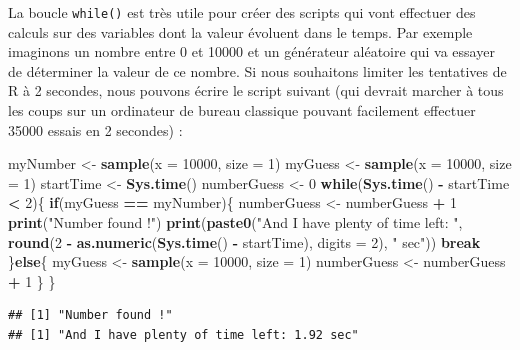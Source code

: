 \documentclass[]{book}
\newenvironment{Shaded}{\begin{snugshade}}{\end{snugshade}}
\newcommand{\ControlFlowTok}[1]{\textcolor[rgb]{0.13,0.29,0.53}{\textbf{#1}}}
\newcommand{\DataTypeTok}[1]{\textcolor[rgb]{0.13,0.29,0.53}{#1}}
\newcommand{\DecValTok}[1]{\textcolor[rgb]{0.00,0.00,0.81}{#1}}
\newcommand{\KeywordTok}[1]{\textcolor[rgb]{0.13,0.29,0.53}{\textbf{#1}}}
\newcommand{\NormalTok}[1]{#1}
\newcommand{\OperatorTok}[1]{\textcolor[rgb]{0.81,0.36,0.00}{\textbf{#1}}}
\newcommand{\StringTok}[1]{\textcolor[rgb]{0.31,0.60,0.02}{#1}}
\begin{document}
La boucle \texttt{while()} est très utile pour créer des scripts qui vont effectuer des calculs sur des variables dont la valeur évoluent dans le temps. Par exemple imaginons un nombre entre 0 et 10000 et un générateur aléatoire qui va essayer de déterminer la valeur de ce nombre. Si nous souhaitons limiter les tentatives de R à 2 secondes, nous pouvons écrire le script suivant (qui devrait marcher à tous les coups sur un ordinateur de bureau classique pouvant facilement effectuer 35000 essais en 2 secondes) :

\begin{Shaded}
\begin{Highlighting}[]
\NormalTok{myNumber <-}\StringTok{ }\KeywordTok{sample}\NormalTok{(}\DataTypeTok{x =} \DecValTok{10000}\NormalTok{, }\DataTypeTok{size =} \DecValTok{1}\NormalTok{)}
\NormalTok{myGuess <-}\StringTok{ }\KeywordTok{sample}\NormalTok{(}\DataTypeTok{x =} \DecValTok{10000}\NormalTok{, }\DataTypeTok{size =} \DecValTok{1}\NormalTok{)}
\NormalTok{startTime <-}\StringTok{ }\KeywordTok{Sys.time}\NormalTok{()}
\NormalTok{numberGuess <-}\StringTok{ }\DecValTok{0}
\ControlFlowTok{while}\NormalTok{(}\KeywordTok{Sys.time}\NormalTok{() }\OperatorTok{-}\StringTok{ }\NormalTok{startTime }\OperatorTok{<}\StringTok{ }\DecValTok{2}\NormalTok{)\{}
  \ControlFlowTok{if}\NormalTok{(myGuess }\OperatorTok{==}\StringTok{ }\NormalTok{myNumber)\{}
\NormalTok{    numberGuess <-}\StringTok{ }\NormalTok{numberGuess }\OperatorTok{+}\StringTok{ }\DecValTok{1}
    \KeywordTok{print}\NormalTok{(}\StringTok{"Number found !"}\NormalTok{)}
    \KeywordTok{print}\NormalTok{(}\KeywordTok{paste0}\NormalTok{(}\StringTok{"And I have plenty of time left: "}\NormalTok{, }
      \KeywordTok{round}\NormalTok{(}\DecValTok{2} \OperatorTok{-}\StringTok{ }\KeywordTok{as.numeric}\NormalTok{(}\KeywordTok{Sys.time}\NormalTok{() }\OperatorTok{-}\StringTok{ }\NormalTok{startTime), }\DataTypeTok{digits =} \DecValTok{2}\NormalTok{), }
      \StringTok{" sec"}\NormalTok{))}
    \ControlFlowTok{break}
\NormalTok{  \}}\ControlFlowTok{else}\NormalTok{\{}
\NormalTok{    myGuess <-}\StringTok{ }\KeywordTok{sample}\NormalTok{(}\DataTypeTok{x =} \DecValTok{10000}\NormalTok{, }\DataTypeTok{size =} \DecValTok{1}\NormalTok{)}
\NormalTok{    numberGuess <-}\StringTok{ }\NormalTok{numberGuess }\OperatorTok{+}\StringTok{ }\DecValTok{1}
\NormalTok{  \}}
\NormalTok{\}}
\end{Highlighting}
\end{Shaded}

\begin{verbatim}
## [1] "Number found !"
## [1] "And I have plenty of time left: 1.92 sec"
\end{verbatim}
\end{document}
